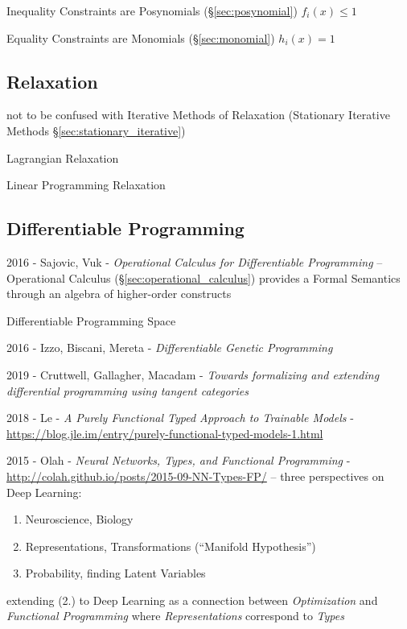 Inequality Constraints are Posynomials (\S\ref{sec:posynomial}) $f_i(x) \leq 1$

Equality Constraints are Monomials (\S\ref{sec:monomial}) $h_i(x) = 1$



\subsection{Relaxation}\label{sec:relaxation}

\fist not to be confused with Iterative Methods of Relaxation (Stationary
Iterative Methods \S\ref{sec:stationary_iterative})

Lagrangian Relaxation

Linear Programming Relaxation



\subsection{Differentiable Programming}\label{sec:differentiable_programming}


2016 - Sajovic, Vuk - \emph{Operational Calculus for Differentiable Programming}
-- Operational Calculus (\S\ref{sec:operational_calculus}) provides a Formal
Semantics through an algebra of higher-order constructs

Differentiable Programming Space

2016 - Izzo, Biscani, Mereta - \emph{Differentiable Genetic Programming}

2019 - Cruttwell, Gallagher, Macadam - \emph{Towards formalizing and extending
differential programming using tangent categories}

2018 - Le - \emph{A Purely Functional Typed Approach to Trainable Models}
- \url{https://blog.jle.im/entry/purely-functional-typed-models-1.html}

\asterism

2015 - Olah - \emph{Neural Networks, Types, and Functional Programming}
- \url{http://colah.github.io/posts/2015-09-NN-Types-FP/} --
three perspectives on Deep Learning:
\begin{enumerate}
  \item Neuroscience, Biology
  \item Representations, Transformations (``Manifold Hypothesis'')
  \item Probability, finding Latent Variables
\end{enumerate}
extending (2.) to Deep Learning as a connection between \emph{Optimization} and
\emph{Functional Programming} where \emph{Representations} correspond to
\emph{Types}



